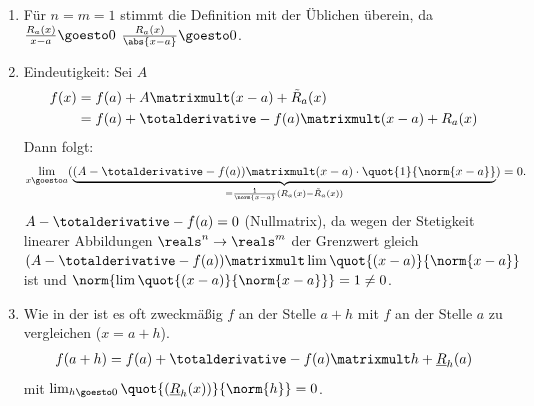 \begin{bemerkungen*}
    \begin{enumerate}
        \item Für \( n=m=1 \) stimmt die Definition mit der Üblichen überein, da \( \frac{R_a(x)}{x-a}\goesto 0 \) \tiff \( \frac{R_a(x)}{\abs{x-a}}\goesto 0 \).
        \item Eindeutigkeit: Sei \( A \) \sd
        \begin{align*}
            f(x)\begin{aligned}[t]
                &=f(a)+A\matrixmult(x-a)+\tilde{R}_a(x)\\
                &=f(a)+\totalderivative-{f}(a)\matrixmult (x-a)+R_a(x)
            \end{aligned}            
        \end{align*}
        Dann folgt:
        \begin{align*}
            \lim_{x \goesto a}(\underbrace{(A-\totalderivative-{f}(a))\matrixmult (x-a)\cdot\quot{1}{\norm{x-a}}}_{=\frac{1}{\norm{x-a}}(R_a(x)-\tilde{R}_a(x))})=0.
        \end{align*}
        \timplies \( A-\totalderivative-{f}(a)=0 \) (Nullmatrix), da wegen der Stetigkeit linearer Abbildungen \( \reals^n\to \reals^m \) der Grenzwert gleich \( (A-\totalderivative-{f}(a))\matrixmult \lim \quot{(x-a)}{\norm{x-a}} \) ist und \( \norm{\lim \quot{(x-a)}{\norm{x-a}}}=1\neq 0 \).
        \item Wie in der  ist es oft zweckmäßig \( f \) an der Stelle \( a+h \) mit \( f \) an der Stelle \( a \) zu vergleichen (\( x=a+h \)).
        \begin{align*}
            f(a+h)=f(a)+\totalderivative-{f}(a)\matrixmult h+\underline{R}_h(a)
        \end{align*}
        mit \( \lim_{h \goesto 0}\quot{(\underline{R}_h(x))}{\norm{h}}=0 \).
    \end{enumerate}
\end{bemerkungen*}
